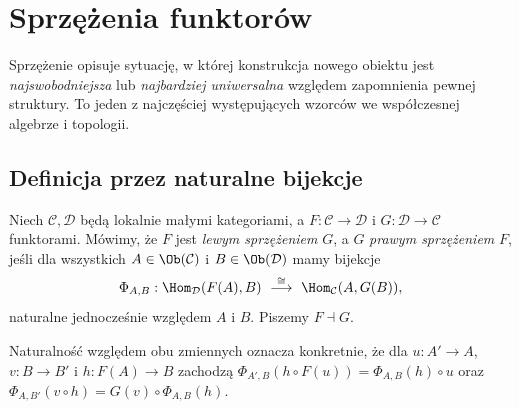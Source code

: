 \section{Sprzężenia funktorów}\label{sec:adjunctions}

Sprzężenie opisuje sytuację, w której konstrukcja nowego obiektu jest \emph{najswobodniejsza} lub \emph{najbardziej uniwersalna} względem zapomnienia pewnej struktury. To jeden z najczęściej występujących wzorców we współczesnej algebrze i topologii.

\subsection{Definicja przez naturalne bijekcje}

\begin{definicja}\label{def:adjunction}
Niech $\mathcal C,\mathcal D$ będą lokalnie małymi kategoriami, a $F:\mathcal C\to\mathcal D$ i $G:\mathcal D\to\mathcal C$ funktorami. Mówimy, że $F$ jest \emph{lewym sprzężeniem} $G$, a $G$ \emph{prawym sprzężeniem} $F$, jeśli dla wszystkich $A\in\Ob(\mathcal C)$ i $B\in\Ob(\mathcal D)$ mamy bijekcje
\[
\Phi_{A,B}:\Hom_{\mathcal D}(F(A),B)\ \overset{\cong}{\longrightarrow}\ \Hom_{\mathcal C}(A,G(B)),
\]
naturalne jednocześnie względem $A$ i $B$. Piszemy $F\dashv G$.
\end{definicja}

Naturalność względem obu zmiennych oznacza konkretnie, że dla $u:A'\to A$, $v:B\to B'$ i $h:F(A)\to B$ zachodzą
$\Phi_{A',B}(h\circ F(u))=\Phi_{A,B}(h)\circ u$ oraz $\Phi_{A,B'}(v\circ h)=G(v)\circ\Phi_{A,B}(h)$.

